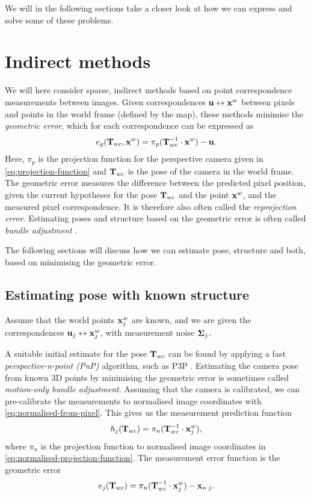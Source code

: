 We will in the following sections take a closer look at how we can express and solve some of these problems.


\section{Indirect methods}
We will here consider sparse, indirect methods based on point correspondence measurements between images.
Given correspondences ${\boldsymbol{\mathbf{u}}} \leftrightarrow {\boldsymbol{\mathbf{x}}}^w$ between pixels and points in the world frame (defined by the map), these methods minimise the \emph{geometric error}, which for each correspondence can be expressed as
\begin{equation}
  e_g({\boldsymbol{\mathbf{T}}}_{wc}, {\boldsymbol{\mathbf{x}}}^w) = \pi_p({\boldsymbol{\mathbf{T}}}_{wc}^{-1} \cdot {\boldsymbol{\mathbf{x}}}^w) - {\boldsymbol{\mathbf{u}}}.
\end{equation}
Here, $\pi_p$ is the projection function for the perspective camera given in \eqref{eq:projection-function} and ${\boldsymbol{\mathbf{T}}}_{wc}$ is the pose of the camera in the world frame.
The geometric error measures the difference between the predicted pixel position, given the current hypotheses for the pose ${\boldsymbol{\mathbf{T}}}_{wc}$ and the point ${\boldsymbol{\mathbf{x}}}^w$, and the measured pixel correspondence.
It is therefore also often called the \emph{reprojection error}.
Estimating poses and structure based on the geometric error is often called \emph{bundle adjustment} \cite{Triggs2000BundleSynthesis}.

The following sections will discuss how we can estimate pose, structure and both, based on minimising the geometric error.

\subsection{Estimating pose with known structure}
Assume that the world points ${\boldsymbol{\mathbf{x}}}^w_j$ are known, and we are given the correspondences ${\boldsymbol{\mathbf{u}}}_j \leftrightarrow {\boldsymbol{\mathbf{x}}}^w_j$, with measurement noise ${\boldsymbol{\mathbf{\Sigma}}}_j$.

A suitable initial estimate for the pose ${\boldsymbol{\mathbf{T}}}_{wc}$ can be found by applying a fast \emph{perspective-n-point (PnP)} algorithm, such as P3P \cite{Kneip2011AOrientation}.
Estimating the camera pose from known 3D points by minimising the geometric error is sometimes called \emph{motion-only bundle adjustment}.
Assuming that the camera is calibrated, we can pre-calibrate the measurements to normalised image coordinates with \eqref{eq:normalised-from-pixel}.
This gives us the measurement prediction function
\begin{equation}
  h_j({\boldsymbol{\mathbf{T}}}_{wc}) = \pi_n({\boldsymbol{\mathbf{T}}}_{wc}^{-1} \cdot {\boldsymbol{\mathbf{x}}}^w_j),
\end{equation}
where $\pi_n$ is the projection function to normalised image coordinates in \eqref{eq:normalised-projection-function}.
The measurement error function is the geometric error
\begin{equation}
  e_j({\boldsymbol{\mathbf{T}}}_{wc}) = \pi_n({\boldsymbol{\mathbf{T}}}_{wc}^{-1} \cdot {\boldsymbol{\mathbf{x}}}^w_j) - {\boldsymbol{\mathbf{x}}}_{n \; j}.
\end{equation}

